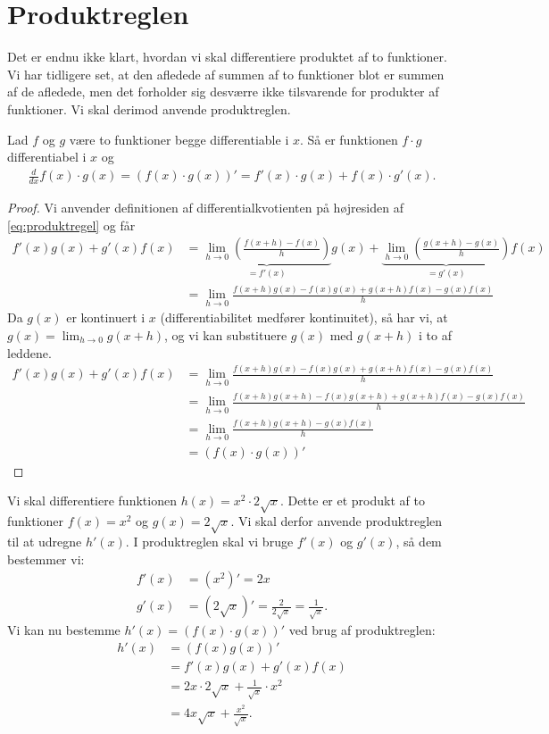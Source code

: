 \section*{Produktreglen}

Det er endnu ikke klart, hvordan vi skal differentiere produktet af to funktioner. Vi har tidligere set, at den afledede af summen af to funktioner blot er summen af de afledede, men det forholder sig desværre ikke tilsvarende for produkter af funktioner. Vi skal derimod anvende produktreglen.
\begin{setn}[Produktreglen]
Lad $f$ og $g$ være to funktioner begge differentiable i $x$. Så er funktionen $f\cdot g$ differentiabel i $x$ og 
\begin{align}\label{eq:produktregel}
\frac{d}{dx} f(x)\cdot g(x) = \left(f(x)\cdot g(x)\right)' = f'(x)\cdot g(x) + f(x)\cdot g'(x).
\end{align}
\end{setn}
\begin{proof}
Vi anvender definitionen af differentialkvotienten på højresiden af \eqref{eq:produktregel} og får
\begin{align*}
f'(x)g(x)+g'(x)f(x) &= \underbrace{\lim_{h\to 0}\left(\frac{f(x+h)-f(x)}{h}\right)}_{=f'(x)}g(x) + \underbrace{\lim_{h\to 0}\left(\frac{g(x+h)-g(x)}{h}\right)}_{=g'(x)}f(x)\\
&=\lim_{h\to 0} \frac{f(x+h)g(x)-f(x)g(x)+g(x+h)f(x)-g(x)f(x)}{h}
\end{align*}
Da $g(x)$ er kontinuert i $x$ (differentiabilitet medfører kontinuitet), så har vi, at $g(x) = \lim_{h\to 0}g(x+h)$, og vi kan substituere $g(x)$ med $g(x+h)$ i to af leddene.
\begin{align*}
f'(x)g(x)+g'(x)f(x) &=  \lim_{h\to 0} \frac{f(x+h)g(x)-f(x)g(x)+g(x+h)f(x)-g(x)f(x)}{h}\\
&=\lim_{h\to 0} \frac{f(x+h)g(x+h)-f(x)g(x+h)+g(x+h)f(x)-g(x)f(x)}{h}\\
&=\lim_{h\to 0} \frac{f(x+h)g(x+h) -g(x)f(x)}{h}\\
&= (f(x)\cdot g(x))'
\end{align*}
\end{proof}

\begin{exa}
Vi skal differentiere funktionen $h(x) = x^2\cdot 2\sqrt{x}$. Dette er et produkt af to funktioner
$f(x) = x^2$ og $g(x)= 2\sqrt{x}$. Vi skal derfor anvende produktreglen til at udregne $h'(x)$. I produktreglen skal vi bruge $f'(x)$ og $g'(x)$, så dem bestemmer vi:
\begin{align*}
f'(x) &= (x^2)' = 2x\\
g'(x) &= (2\sqrt{x})' = \frac{2}{2\sqrt{x}} = \frac{1}{\sqrt{x}}.
\end{align*} 
Vi kan nu bestemme $h'(x) = (f(x)\cdot g(x))'$ ved brug af produktreglen:
\begin{align*}
h'(x) &= (f(x)g(x))' \\
&= f'(x)g(x)+g'(x)f(x) \\
&= 2x\cdot 2\sqrt{x} + \frac{1}{\sqrt{x}}\cdot x^2\\
&= 4x\sqrt{x} + \frac{x^2}{\sqrt{x}}.
\end{align*}
\end{exa}

